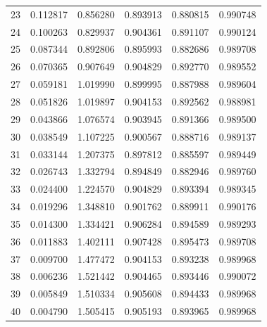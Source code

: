 \begin{table}[ht]
\begin{tabular}{c c c c c c}
23 & 0.112817 & 0.856280 & 0.893913 & 0.880815 & 0.990748 \\
24 & 0.100263 & 0.829937 & 0.904361 & 0.891107 & 0.990124 \\
25 & 0.087344 & 0.892806 & 0.895993 & 0.882686 & 0.989708 \\
26 & 0.070365 & 0.907649 & 0.904829 & 0.892770 & 0.989552 \\
27 & 0.059181 & 1.019990 & 0.899995 & 0.887988 & 0.989604 \\
28 & 0.051826 & 1.019897 & 0.904153 & 0.892562 & 0.988981 \\
29 & 0.043866 & 1.076574 & 0.903945 & 0.891366 & 0.989500 \\
30 & 0.038549 & 1.107225 & 0.900567 & 0.888716 & 0.989137 \\
31 & 0.033144 & 1.207375 & 0.897812 & 0.885597 & 0.989449 \\
32 & 0.026743 & 1.332794 & 0.894849 & 0.882946 & 0.989760 \\
33 & 0.024400 & 1.224570 & 0.904829 & 0.893394 & 0.989345 \\
34 & 0.019296 & 1.348810 & 0.901762 & 0.889911 & 0.990176 \\
35 & 0.014300 & 1.334421 & 0.906284 & 0.894589 & 0.989293 \\
36 & 0.011883 & 1.402111 & 0.907428 & 0.895473 & 0.989708 \\
37 & 0.009700 & 1.477472 & 0.904153 & 0.893238 & 0.989968 \\
38 & 0.006236 & 1.521442 & 0.904465 & 0.893446 & 0.990072 \\
39 & 0.005849 & 1.510334 & 0.905608 & 0.894433 & 0.989968 \\
40 & 0.004790 & 1.505415 & 0.905193 & 0.893965 & 0.989968 \\
\hline
\end{tabular}
\end{table}


